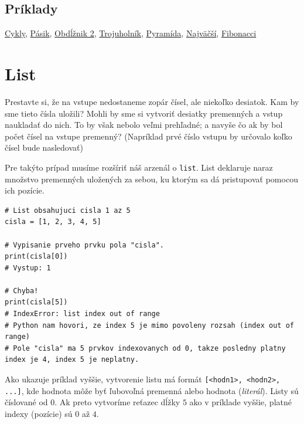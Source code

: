 \documentclass{article}
\begin{document}
\subsection{Príklady}
\href{https://testovac.ksp.sk/tasks/ls-uvod-cykly/}{Cykly},
\href{https://testovac.ksp.sk/tasks/ls-uvod-pasik/}{Pásik},
\href{https://testovac.ksp.sk/tasks/ls-uvod-obdlznik2/}{Obdĺžnik 2},
\href{https://testovac.ksp.sk/tasks/ls-uvod-trojuholnik/}{Trojuholník},
\href{https://testovac.ksp.sk/tasks/ls-uvod-pyramida/}{Pyramída},
\href{https://testovac.ksp.sk/tasks/ls-uvod-najvacsi/}{Najväčší},
\href{https://testovac.ksp.sk/tasks/ls-uvod-fibonacci/}{Fibonacci}

\section{List}

Prestavte si, že na vstupe nedostaneme zopár čísel, ale niekoľko desiatok. Kam by sme tieto čísla uložili? Mohli by sme si vytvoriť desiatky premenných a vstup naukladať do nich. To by však nebolo veľmi prehľadné; a navyše čo ak by bol počet čísel na vstupe premenný? (Napríklad prvé číslo vstupu by určovalo koľko čísel bude nasledovať)

Pre takýto prípad musíme rozšíriť náš arzenál o \texttt{list}. List deklaruje naraz množstvo premenných uložených za sebou, ku ktorým sa dá pristupovať pomocou ich pozície.
\begin{lstlisting}
# List obsahujuci cisla 1 az 5
cisla = [1, 2, 3, 4, 5]

# Vypisanie prveho prvku pola "cisla".
print(cisla[0])
# Vystup: 1

# Chyba!
print(cisla[5])
# IndexError: list index out of range
# Python nam hovori, ze index 5 je mimo povoleny rozsah (index out of range)
# Pole "cisla" ma 5 prvkov indexovanych od 0, takze posledny platny index je 4, index 5 je neplatny.
\end{lstlisting}

Ako ukazuje príklad vyššie, vytvorenie listu má formát \texttt{[<hodn1>, <hodn2>, ...]}, kde hodnota môže byť ľubovoľná premenná alebo hodnota (\textit{literál}). Listy sú číslované od $0$. Ak preto vytvoríme reťazec dĺžky $5$ ako v príklade vyššie, platné indexy (pozície) sú $0$ až $4$. 
\end{document}
